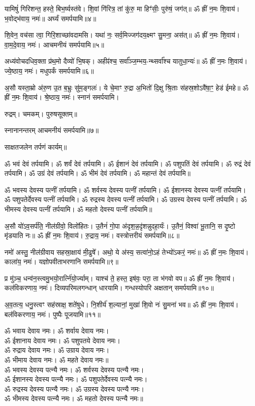 यामिषुं॑ गिरिशन्त॒ हस्ते॒ बिभ॒र्ष्यस्त॑वे। शि॒वां गि॑रित्र॒ तां कु॑रु॒ मा हिꣳ॑सीः॒ पुरु॑षं॒ जग॑त्॥ ॐ ह्रीं न॒मः शि॒वाय॑। भ॒वोद्भ॑वाय॒ नमः॑॥ अर्घ्यं समर्पयामि॥४॥

शि॒वेन॒ वच॑सा त्वा॒ गिरि॒शाच्छा॑वदामसि। यथा॑ नः॒ सर्व॒मिज्जग॑दय॒क्ष्मꣳ सु॒मना॒ अस॑त्॥ ॐ ह्रीं न॒मः शि॒वाय॑। वा॒म॒दे॒वाय॒ नमः॑। आचमनीयं समर्पयामि॥५॥

अध्य॑वोचदधिव॒क्ता प्र॑थ॒मो दैव्यो॑ भि॒षक्। अहीꣴ॑श्च॒ सर्वा᳚ञ्ज॒म्भय॒-न्थ्सर्वा᳚श्च यातुधा॒न्यः॑॥ ॐ ह्रीं न॒मः शि॒वाय॑। ज्ये॒ष्ठाय॒ नमः॑। मधुपर्कं समर्पयामि॥६॥

अ॒सौ यस्ता॒म्रो अ॑रु॒ण उ॒त ब॒भ्रुः सु॑म॒ङ्गलः॑। ये चे॒माꣳ रु॒द्रा अ॒भितो॑ दि॒क्षु श्रि॒ताः स॑हस्र॒शोऽवै॑षा॒ꣳ॒ हेड॑ ईमहे॥ ॐ ह्रीं न॒मः शि॒वाय॑। श्रे॒ष्ठाय॒ नमः॑। स्नानं समर्पयामि। 


रुद्रम्। चमकम्। पुरुषसूक्तम्॥


स्नानानन्तरम् आचमनीयं समर्पयामि॥७॥

साक्षतजलेन तर्पणं कार्यम्॥

ॐ भवं देवं तर्पयामि। ॐ शर्वं देवं तर्पयामि। ॐ ईशानं देवं तर्पयामि। ॐ पशुपतिं देवं तर्पयामि। ॐ रुद्रं देवं तर्पयामि। ॐ उग्रं देवं तर्पयामि। ॐ भीमं देवं तर्पयामि। ॐ महान्तं देवं तर्पयामि॥

ॐ भवस्य देवस्य पत्नीं तर्पयामि। ॐ शर्वस्य देवस्य पत्नीं तर्पयामि। ॐ ईशानस्य देवस्य पत्नीं तर्पयामि। ॐ पशुपतेर्देवस्य पत्नीं तर्पयामि। ॐ रुद्रस्य देवस्य पत्नीं तर्पयामि। ॐ उग्रस्य देवस्य पत्नीं तर्पयामि। ॐ भीमस्य देवस्य पत्नीं तर्पयामि। ॐ महतो देवस्य पत्नीं तर्पयामि॥


अ॒सौ यो॑ऽव॒सर्प॑ति॒ नील॑ग्रीवो॒ विलो॑हितः। उ॒तैनं॑ गो॒पा अ॑दृश॒न्न॒दृ॑शन्नुदहा॒र्यः॑। उ॒तैनं॒ विश्वा॑ भू॒तानि॒ स दृ॒ष्टो मृ॑डयाति नः॥ ॐ ह्रीं न॒मः शि॒वाय॑। रु॒द्राय॒ नमः॑। वस्त्रोत्तरीयं समर्पयामि॥८॥

नमो॑ अस्तु॒ नील॑ग्रीवाय सहस्रा॒क्षाय॑ मी॒ढुषे᳚। अथो॒ ये अ॑स्य॒ सत्वा॑नो॒ऽहं तेभ्यो॑ऽकरं॒ नमः॑॥ ॐ ह्रीं न॒मः शि॒वाय॑। काला॑य॒ नमः॑। यज्ञोपवीताभरणानि समर्पयामि॥९॥

प्र मु॑ञ्च॒ धन्व॑न॒स्त्वमु॒भयो॒रार्त्नि॑यो॒र्ज्याम्। याश्च॑ ते॒ हस्त॒ इष॑वः॒ परा॒ ता भ॑गवो वप॥ ॐ ह्रीं न॒मः शि॒वाय॑। कल॑विकरणाय॒ नमः॑। दिव्यपरिमलगन्धान् धारयामि। गन्धस्योपरि अक्षतान् समर्पयामि॥१०॥

अ॒व॒तत्य॒ धनु॒स्त्वꣳ सह॑स्राक्ष॒ शते॑षुधे। नि॒शीर्य॑ श॒ल्यानां॒ मुखा॑ शि॒वो नः॑ सु॒मना॑ भव॥ ॐ ह्रीं न॒मः शि॒वाय॑। बल॑विकरणाय॒ नमः॑। पुष्पैः पूजयामि॥११॥


ॐ भवाय देवाय नमः। ॐ शर्वाय देवाय नमः। \\
ॐ ईशानाय देवाय नमः। ॐ पशुपतये देवाय नमः।\\
ॐ रुद्राय देवाय नमः। ॐ उग्राय देवाय नमः।\\
ॐ भीमाय देवाय नमः। ॐ महते देवाय नमः॥\\
ॐ भवस्य देवस्य पत्न्यै नमः। ॐ शर्वस्य देवस्य पत्न्यै नमः।\\
ॐ ईशानस्य देवस्य पत्न्यै नमः। ॐ पशुपतेर्देवस्य पत्न्यै नमः।\\
ॐ रुद्रस्य देवस्य पत्न्यै नमः। ॐ उग्रस्य देवस्य पत्न्यै नमः।\\
ॐ भीमस्य देवस्य पत्न्यै नमः। ॐ महतो देवस्य पत्न्यै नमः॥ \\


